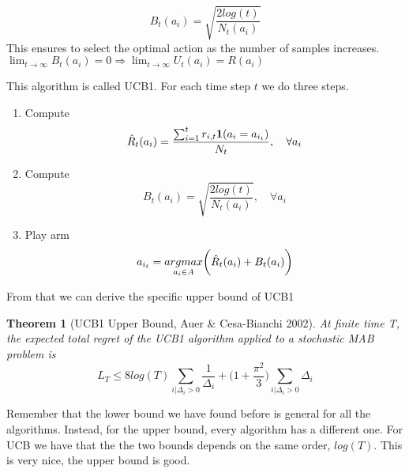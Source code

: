 \documentclass[main.tex]{subfiles}
\newtheorem{theorem}{Theorem}[section]
\begin{document}
\begin{equation}
    B_t(a_i) = \sqrt{\frac{2log(t)}{N_t(a_i)}}
\end{equation}
This ensures to select the optimal action as the number of samples increases. $\lim_{t \rightarrow \infty} B_t(a_i) = 0 \Rightarrow \lim_{t \rightarrow \infty} U_t(a_i) = R(a_i)$
\par \noindent
This algorithm is called UCB1. For each time step $t$ we do three steps.
\begin{enumerate}
    \item Compute
\begin{equation*}
    \Hat{R}_t(a_i) = \frac{\sum_{i=1}^t r_{i,t} \mathbf{1}(a_i=a_{i_t})}{N_t}, \quad \forall a_i
\end{equation*}
    \item Compute
\begin{equation*}
    B_t(a_i) = \sqrt{\frac{2log(t)}{N_t(a_i)}}, \quad \forall a_i
\end{equation*}
    \item Play arm
\begin{equation*}
    a_{i_t} = \underset{a_i \in A}{argmax}\bigg( \Hat{R}_t(a_i) + B_t(a_i) \bigg)
\end{equation*}
\end{enumerate}
From that we can derive the specific upper bound of UCB1
\begin{theorem}[UCB1 Upper Bound, Auer \& Cesa-Bianchi 2002]
At finite time T, the expected total regret of the UCB1 algorithm applied to a
stochastic MAB problem is
\begin{equation*}
    L_T \leq 8log(T) \sum_{i|\Delta_i > 0} \frac{1}{\Delta_i} + \bigg( 1+ \frac{\pi^2}{3} \bigg) \sum_{i|\Delta_i > 0} \Delta_i
\end{equation*}
\end{theorem}
\par \noindent
Remember that the lower bound we have found before is general for all the algorithms. Instead, for the upper bound, every algorithm has a different one. For UCB we have that the the two bounds depends on the same order, $log(T)$. This is very nice, the upper bound is good.
\end{document}
